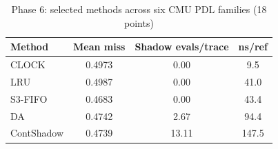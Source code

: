 \begin{table}[t]
\caption{Phase 6: selected methods across six CMU PDL families (18 points)}
\label{tab:pdl_main}
\centering\footnotesize
\begin{tabular}{@{}lccc@{}}
\toprule
Method & Mean miss & Shadow evals/trace & ns/ref \\
\midrule
CLOCK & 0.4973 & 0.00 & 9.5 \\
LRU & 0.4987 & 0.00 & 41.0 \\
S3-FIFO & 0.4683 & 0.00 & 43.4 \\
DA & 0.4742 & 2.67 & 94.4 \\
ContShadow & 0.4739 & 13.11 & 147.5 \\
\bottomrule
\end{tabular}
\end{table}
